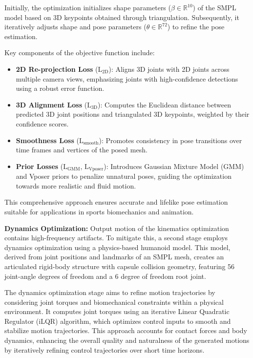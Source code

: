 \documentclass{egpubl}
\begin{document}
Initially, the optimization initializes shape parameters ($\beta \in \mathbb{R}^{10}$) of the SMPL model based on 3D keypoints obtained through triangulation. Subsequently, it iteratively adjusts shape and pose parameters ($\theta \in \mathbb{R}^{72}$) to refine the pose estimation.

Key components of the objective function include:

\begin{itemize}
    \item \textbf{2D Re-projection Loss} ($\mathrm{L}_\text{2D}$): Aligns 3D joints with 2D joints across multiple camera views, emphasizing joints with high-confidence detections using a robust error function.
    \item \textbf{3D Alignment Loss} ($\mathrm{L}_\text{3D}$): Computes the Euclidean distance between predicted 3D joint positions and triangulated 3D keypoints, weighted by their confidence scores.
    \item \textbf{Smoothness Loss} ($\mathrm{L}_\text{smooth}$): Promotes consistency in pose transitions over time frames and vertices of the posed mesh.
    \item \textbf{Prior Losses} ($\mathrm{L}_{\text{GMM}}$, $\mathrm{L}_{\text{Vposer}}$): Introduces Gaussian Mixture Model (GMM) and Vposer priors to penalize unnatural poses, guiding the optimization towards more realistic and fluid motion.
\end{itemize}
 This comprehensive approach ensures accurate and lifelike pose estimation suitable for applications in sports biomechanics and animation.


\textbf{Dynamics Optimization:} Output motion of the kinematics optimization contains high-frequency artifacts. To mitigate this, a second stage employs dynamics optimization using a physics-based humanoid model. This model, derived from joint positions and landmarks of an SMPL mesh, creates an articulated rigid-body structure with capsule collision geometry, featuring 56 joint-angle degrees of freedom and a 6 degree of freedom root joint.

The dynamics optimization stage aims to refine motion trajectories by considering joint torques and biomechanical constraints within a physical environment. It computes joint torques using an iterative Linear Quadratic Regulator (iLQR) algorithm, which optimizes control inputs to smooth and stabilize motion trajectories. This approach accounts for contact forces and body dynamics, enhancing the overall quality and naturalness of the generated motions by iteratively refining control trajectories over short time horizons.



 
 
\end{document}
